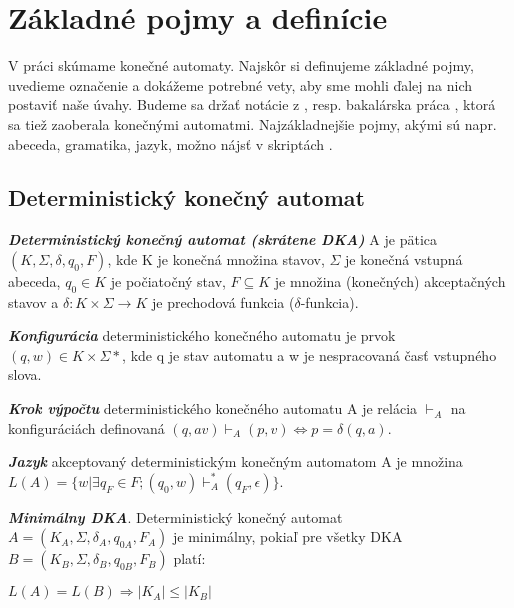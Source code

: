 \chapter{Základné pojmy a definície}

V práci skúmame konečné automaty. Najskôr si definujeme základné pojmy, uvedieme označenie a dokážeme potrebné vety, aby sme mohli ďalej na nich postaviť naše úvahy. Budeme sa držať notácie z \cite{hopcroft}, resp. bakalárska práca \cite{petruchova}, ktorá sa tiež zaoberala konečnými automatmi. Najzákladnejšie pojmy, akými sú napr. abeceda, gramatika, jazyk, možno nájsť v skriptách \cite{skripta}.

\section{Deterministický konečný automat}

\begin{defn}{\textbf {\textit {Deterministický konečný automat (skrátene DKA)}}} A je pätica $(K,\Sigma,\delta,q_0,F)$, kde K je konečná množina stavov, $\Sigma$ je konečná vstupná abeceda, $q_0 \in K$ je počiatočný stav, $F \subseteq K$ je množina (konečných) akceptačných stavov a $\delta: K \times \Sigma \rightarrow K$ je prechodová funkcia ($\delta$-funkcia).  
\end{defn}

\begin{defn}{\textbf {\textit {Konfigurácia}}} deterministického konečného automatu je prvok $(q,w) \in K \times \Sigma*$, kde q je stav automatu a w je nespracovaná časť vstupného slova.\end{defn}

\begin{defn}{\textbf {\textit {Krok výpočtu}}} deterministického konečného automatu A je relácia $\vdash_A$ na konfiguráciách definovaná $(q,av)\vdash_A(p,v) \Longleftrightarrow p=\delta(q,a)$.\end{defn}

\begin{defn}{\textbf {\textit {Jazyk}}} akceptovaný deterministickým konečným automatom A je množina $L(A) = \{w | \exists q_F \in F; (q_0,w) \vdash^*_A(q_F,\epsilon)\}$.\end{defn}

\begin{defn}{\textbf {\textit {Minimálny DKA}}}. Deterministický konečný automat
\\ 
$A=(K_A,\Sigma,\delta_A,q_{0A},F_A)$ je minimálny, pokiaľ pre všetky DKA $B = (K_B,\Sigma,\delta_B,q_{0B},F_B)$ platí:
\\
\centerline{$L(A) = L(B) \Rightarrow |K_A| \leq |K_B|$}
\end{defn}

